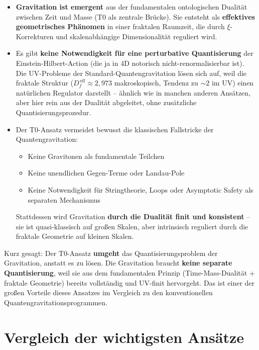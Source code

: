 	\begin{itemize}
		\item \textbf{Gravitation ist emergent} aus der fundamentalen ontologischen Dualität zwischen Zeit und Masse (T0 als zentrale Brücke). Sie entsteht als \textbf{effektives geometrisches Phänomen} in einer fraktalen Raumzeit, die durch $\xi$-Korrekturen und skalenabhängige Dimensionalität reguliert wird.
		
		\item Es gibt \textbf{keine Notwendigkeit für eine perturbative Quantisierung} der \\ Einstein-Hilbert-Action (die ja in 4D notorisch nicht-renormalisierbar ist). Die UV-Probleme der Standard-Quantengravitation lösen sich auf, weil die fraktale Struktur ($D_f^{\,\text{eff}} \approx 2{,}973$ makroskopisch, Tendenz zu $\sim 2$ im UV) einen natürlichen Regulator darstellt -- ähnlich wie in manchen anderen Ansätzen, aber hier rein aus der Dualität abgeleitet, ohne zusätzliche Quantisierungsprozedur.
		
		\item Der T0-Ansatz vermeidet bewusst die klassischen Fallstricke der Quantengravitation:
		\begin{itemize}
			\item Keine Gravitonen als fundamentale Teilchen
			\item Keine unendlichen Gegen-Terme oder Landau-Pole
			\item Keine Notwendigkeit für Stringtheorie, Loops oder Asymptotic Safety als separaten Mechanismus
		\end{itemize}
		Stattdessen wird Gravitation \textbf{durch die Dualität finit und konsistent} -- sie ist quasi-klassisch auf großen Skalen, aber intrinsisch reguliert durch die fraktale Geometrie auf kleinen Skalen.
	\end{itemize}
	
	Kurz gesagt: Der T0-Ansatz \textbf{umgeht} das Quantisierungsproblem der Gravitation, anstatt es zu lösen. Die Gravitation braucht \textbf{keine separate Quantisierung}, weil sie aus dem fundamentalen Prinzip (Time-Mass-Dualität + fraktale Geometrie) bereits vollständig und UV-finit hervorgeht. Das ist einer der großen Vorteile dieses Ansatzes im Vergleich zu den konventionellen Quantengravitationsprogrammen.
	
	\section{Vergleich der wichtigsten Ansätze}
	
